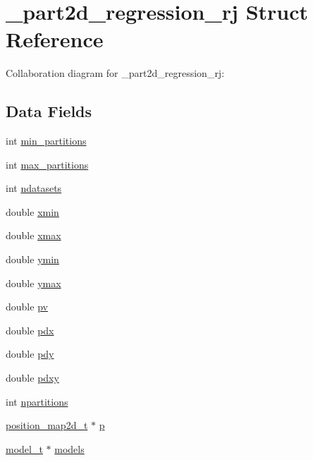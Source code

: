 \hypertarget{struct__part2d__regression__rj}{}\section{\+\_\+part2d\+\_\+regression\+\_\+rj Struct Reference}
\label{struct__part2d__regression__rj}


Collaboration diagram for \+\_\+part2d\+\_\+regression\+\_\+rj\+:
\subsection*{Data Fields}
\begin{DoxyCompactItemize}
\item 
int \hyperlink{struct__part2d__regression__rj_a14cd1c40f5df738d51d6fe75e4d0f1d2}{min\+\_\+partitions}
\item 
int \hyperlink{struct__part2d__regression__rj_a749af75f5b6ebfdc9853b0f5a36f4d62}{max\+\_\+partitions}
\item 
int \hyperlink{struct__part2d__regression__rj_ad7c988b66b5acff1cdaf0da01bd0b3cf}{ndatasets}
\item 
double \hyperlink{struct__part2d__regression__rj_a29ea39843b67dea844d76ec66bf90a50}{xmin}
\item 
double \hyperlink{struct__part2d__regression__rj_a3c73d6f7af4e89b4f38c63d27ebc9855}{xmax}
\item 
double \hyperlink{struct__part2d__regression__rj_a3044ffaca3e7edee55b4f6a5198d8ee8}{ymin}
\item 
double \hyperlink{struct__part2d__regression__rj_ac49ba4e67b0d272df1fce92fdf6c24ce}{ymax}
\item 
double \hyperlink{struct__part2d__regression__rj_aa493607e559cd57220e3359b5c083e3f}{pv}
\item 
double \hyperlink{struct__part2d__regression__rj_a275de1ec4f9dcc612f18d4301a25c5ba}{pdx}
\item 
double \hyperlink{struct__part2d__regression__rj_ae554fea517847483b54523c0a53b8d69}{pdy}
\item 
double \hyperlink{struct__part2d__regression__rj_a4847fa9810f91bf131437ce0b0b2aa2e}{pdxy}
\item 
int \hyperlink{struct__part2d__regression__rj_a5f095d104acedc2961df8eacd07d2668}{npartitions}
\item 
\hyperlink{position__map2d_8h_a6d86d9b9f02238a497ecf2ebff2e1e39}{position\+\_\+map2d\+\_\+t} $\ast$ \hyperlink{struct__part2d__regression__rj_a97029ced96e99e43cefeed0cc6706063}{p}
\item 
\hyperlink{part1d__forwardmodel_8c_a0a038e31b1f765296a40c2da07b46a84}{model\+\_\+t} $\ast$ \hyperlink{struct__part2d__regression__rj_addaee14f78c7019e13b543eacf986643}{models}
\end{DoxyCompactItemize}


